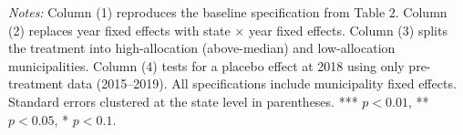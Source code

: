 \begin{table}[htbp]
   \par \raggedright
   \textit{Notes:} Column (1) reproduces the baseline specification from Table 2. Column (2) replaces year fixed effects with state $\times$ year fixed effects. Column (3) splits the treatment into high-allocation (above-median) and low-allocation municipalities. Column (4) tests for a placebo effect at 2018 using only pre-treatment data (2015--2019). All specifications include municipality fixed effects. Standard errors clustered at the state level in parentheses. *** $p<0.01$, ** $p<0.05$, * $p<0.1$.
\end{table}



